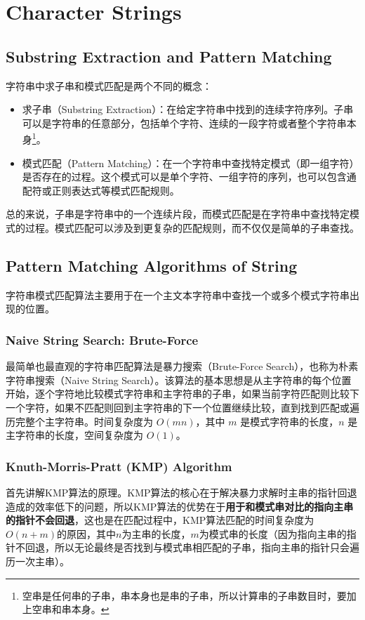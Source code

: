 \chapter{Character Strings}
\section{Substring Extraction and Pattern Matching}
字符串中求子串和模式匹配是两个不同的概念：

\begin{itemize}
    \item 求子串（Substring Extraction）：在给定字符串中找到的连续字符序列。子串可以是字符串的任意部分，包括单个字符、连续的一段字符或者整个字符串本身\footnote{空串是任何串的子串，串本身也是串的子串，所以计算串的子串数目时，要加上空串和串本身。}。
    \item 模式匹配（Pattern Matching）：在一个字符串中查找特定模式（即一组字符）是否存在的过程。这个模式可以是单个字符、一组字符的序列，也可以包含通配符或正则表达式等模式匹配规则。
\end{itemize}

总的来说，子串是字符串中的一个连续片段，而模式匹配是在字符串中查找特定模式的过程。模式匹配可以涉及到更复杂的匹配规则，而不仅仅是简单的子串查找。

\section{Pattern Matching Algorithms of String}
字符串模式匹配算法主要用于在一个主文本字符串中查找一个或多个模式字符串出现的位置。

\subsection{Naive String Search: Brute-Force}
最简单也最直观的字符串匹配算法是暴力搜索（Brute-Force Search），也称为朴素字符串搜索（Naive String Search）。该算法的基本思想是从主字符串的每个位置开始，逐个字符地比较模式字符串和主字符串的子串，如果当前字符匹配则比较下一个字符，如果不匹配则回到主字符串的下一个位置继续比较，直到找到匹配或遍历完整个主字符串。时间复杂度为 $O(mn)$，其中 $m$ 是模式字符串的长度，$n$ 是主字符串的长度，空间复杂度为 $O(1)$。

\subsection{Knuth-Morris-Pratt (KMP) Algorithm}
首先讲解KMP算法的原理。KMP算法的核心在于解决暴力求解时主串的指针回退造成的效率低下的问题，所以KMP算法的优势在于\textbf{用于和模式串对比的指向主串的指针不会回退}，这也是在匹配过程中，KMP算法匹配的时间复杂度为$O(n + m)$的原因，其中$n$为主串的长度，$m$为模式串的长度（因为指向主串的指针不回退，所以无论最终是否找到与模式串相匹配的子串，指向主串的指针只会遍历一次主串）。

